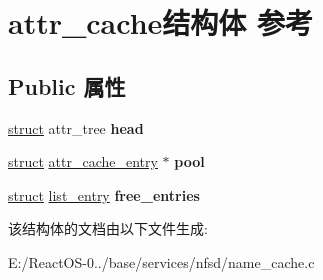 \hypertarget{structattr__cache}{}\section{attr\+\_\+cache结构体 参考}
\label{structattr__cache}
\subsection*{Public 属性}
\begin{DoxyCompactItemize}
\item 
\mbox{\label{structattr__cache_a93f7487e6cf064cdecaf070869cef31c}} 
\hyperlink{interfacestruct}{struct} attr\+\_\+tree {\bfseries head}
\item 
\mbox{\label{structattr__cache_a840c272216ec46bb74fc42103fd331b4}} 
\hyperlink{interfacestruct}{struct} \hyperlink{structattr__cache__entry}{attr\+\_\+cache\+\_\+entry} $\ast$ {\bfseries pool}
\item 
\mbox{\label{structattr__cache_adcb455c67c540082cce470281e9d7397}} 
\hyperlink{interfacestruct}{struct} \hyperlink{structlist__entry}{list\+\_\+entry} {\bfseries free\+\_\+entries}
\end{DoxyCompactItemize}


该结构体的文档由以下文件生成\+:\begin{DoxyCompactItemize}
\item 
E\+:/\+React\+O\+S-\/0../base/services/nfsd/name\+\_\+cache.\+c\end{DoxyCompactItemize}
